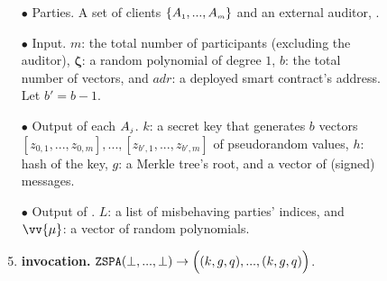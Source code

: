 



\begin{figure}[ht]%
\setlength{\fboxsep}{1pt}
\begin{center}
    \begin{tcolorbox}[enhanced,width=4.78in, height=110mm,right=.5mm,
    drop fuzzy shadow southwest,
    colframe=black,colback=white]

{\small{
\vspace{-2mm}
\begin{enumerate}[leftmargin=-.01mm]


\item[$\bullet$]    {Parties.} A set of clients $\{ A_{\scriptscriptstyle 1},...,  A_{\scriptscriptstyle m}\}$ and an external auditor, \aud. 

\item[$\bullet$]    {Input.}  $m$: the total number of participants (excluding the auditor), $\bm\zeta$: a random polynomial of degree $1$, $b$: the total number of vectors, and $adr$: a deployed smart contract's address. Let $b'=b-1$.







\item[$\bullet$]  {Output of  each} $  A_{\scriptscriptstyle j}$.   $k$: a secret key that generates $b$ vectors $[z_{\scriptscriptstyle 0,1},...,z_{\scriptscriptstyle 0,m}],...,[z_{\scriptscriptstyle b',1},...,z_{\scriptscriptstyle b', m}]$ of pseudorandom values, $h$: hash of the key,  $g$: a Merkle tree's root, and a vector of (signed) messages. 



\item[$\bullet$]    {Output of \aud.} $L$: a list of misbehaving parties' indices, and  $\vv{{\mu}}$: a vector of random polynomials.
%
\item\label{ZSPA::ZSPA-invocation} {\textbf{\zspa invocation.}  $\mathtt{ZSPA}(\bot,..., \bot)\rightarrow \Big((k, g, q),..., (k, g,q )\Big)$}. 


\end{enumerate}}}
\end{tcolorbox}
\end{center}
\end{figure}
